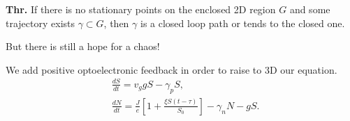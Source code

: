 \textbf{Thr.} If there is no stationary points on the enclosed 2D region $G$ and some trajectory exists $\gamma \subset G$, then $\gamma$ is a closed loop path or tends to the closed one.

But there is still a hope for a chaos!

We add positive optoelectronic feedback in order to raise to 3D our equation.
\begin{align*}
	&\frac{d S}{d t} = v_g g S - \gamma_p S,\\
	&\frac{d N}{d t} = \frac{J}{e}[1 + \frac{\xi S(t-\tau)}{S_0}] - \gamma_n N - g S.
\end{align*}
